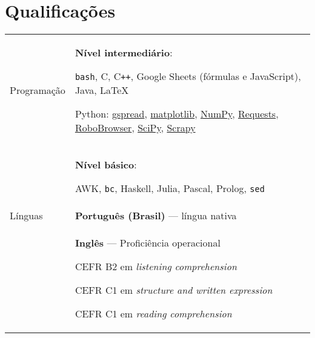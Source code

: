 \documentclass{article}
\newenvironment{contenttable}[1]
  {\section*{#1}
   \newcolumntype{L}{>{\bf \raggedleft}p{0.13\textwidth}}
   \newcolumntype{R}{p{0.82\textwidth}}
   \begin{tabular}{L!{\color{lightgray} \vrule}R}}
  {\end{tabular}}
\newenvironment{smallitem}
  {\vspace{-2mm}\itemize%
   \setlength{\parskip}{0pt}
   \setlength{\itemsep}{2pt}}
  {\vspace{-2mm}\enditemize}
\begin{document}
\begin{contenttable}{Qualificações}
  Programação & \textbf{Nível intermediário}:
  \begin{smallitem}
    \item \verb!bash!, C, C\verb!++!, Google Sheets (fórmulas e JavaScript),
      Java, \LaTeX{}
    \item Python: \href{https://github.com/burnash/gspread}{gspread},
      \href{http://matplotlib.org/}{matplotlib},
      \href{http://www.numpy.org/}{NumPy},
      \href{http://docs.python-requests.org/en/latest/#}{Requests},
      \href{https://github.com/jmcarp/robobrowser}{RoboBrowser},
      \href{http://www.scipy.org/}{SciPy},
      \href{http://scrapy.org/}{Scrapy}
  \end{smallitem} \\

  & \textbf{Nível básico}:
  \begin{smallitem}
    \item AWK, \verb!bc!, Haskell, Julia, Pascal, Prolog, \verb!sed!
  \end{smallitem} \\

  Línguas & \textbf{Português (Brasil)} --- língua nativa \\
  & \textbf{Inglês} --- Proficiência operacional
  \begin{smallitem}
    \item CEFR B2 em \textit{listening comprehension}
    \item CEFR C1 em \textit{structure and written expression}
    \item CEFR C1 em \textit{reading comprehension}
  \end{smallitem}
\end{contenttable}
\end{document}
